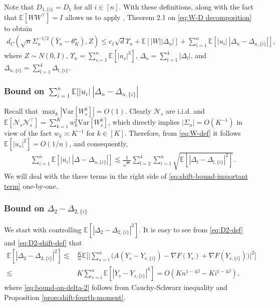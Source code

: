 \documentclass[a4paper,11pt]{article}
\numberwithin{equation}{section}
\theoremstyle{plain}
\theoremstyle{remark}
\def\IE{\mathbb{E}}
\newcommand{\shift}[2]{#1_{#2, \{i\}}}
\newcommand{\minparam}{\theta^\star_K}
\newcommand{\var}{\mathrm{Var}}
\begin{document}
Note that $\shift{D}{1}=D_1$ for all $i \in [n]$. With these definitions, along with the fact that $\IE[WW^\top]=I$ allows us to apply \cite{shao-berry-esseen}, Theorem 2.1 on \eqref{eq:W-D decomposition} to obtain
\begin{align} \label{eq:berry-esseen_initial}
    d_C( \sqrt{n}\Sigma_n^{-1/2}(\bar{Y}_n - \minparam) , Z) \leq c_1 \sqrt{d}\Upsilon_n + \IE[|W||\Delta_n|] + \sum_{i=1}^n \IE[|u_i| \  |\Delta_n- \shift{\Delta}{n}|],
\end{align}
where $Z \sim N(0, I)$, $\Upsilon_n =\sum_{s=1}^n \IE[|u_s|^3]$, $\Delta_n=\sum_{l=1}^4 |\Delta_l|$, and $\shift{\Delta}{n}=\sum_{l=1}^4 \shift{\Delta}{l}$.
\subsubsection{Bound on $\sum_{i=1}^n \IE[|u_i| \  |\Delta_n- \shift{\Delta}{n}|$}
Recall that $\max_k |\var[W_s^k]|=O(1)$. Clearly $\mathcal{N}_s$ are i.i.d. and $\IE[\mathcal{N}_s \mathcal{N}_s^\top]=\sum_{k=1}^K w_k^2 \var[W_s^k]$, which directly implies $|\Sigma_n| = O(K^{-1})$ in view of the fact $w_k \asymp K^{-1}$ for $k \in [K]$. Therefore, from \eqref{eq:W-def} it follows $\IE[|u_s|^2]=O(1/n)$, and consequently,
\begin{align}
    &\sum_{i=1}^n \IE[|u_i| \  |\Delta- \shift{\Delta}{n}|]
    \lesssim  \frac{1}{\sqrt{n}} \sum_{l=2}^4\sum_{i=1}^n\sqrt{\IE[|\Delta_l - \shift{\Delta}{l}|^2]}. \label{eq:shift-bound-important term}
\end{align}
We will deal with the three terms in the right side of \eqref{eq:shift-bound-important term} one-by-one.

\subsubsection{Bound on $\Delta_2 - \shift{\Delta}{2}$} \label{se:bound-start}
We start with controlling $\IE[|\Delta_2 - \shift{\Delta}{2}|^2]$. It is easy to see from \eqref{eq:D2-def} and \eqref{eq:D2-shift-def} that
\begin{align}
    \IE[|\Delta_2 - \shift{\Delta}{2}|^2] \lesssim & {\frac{K}{n}} \IE\bigg[\Big| \sum_{s=i}^n \big(A(Y_{s} - \shift{Y}{s}) - \nabla F(Y_{s}) + \nabla F(\shift{Y}{s})\big)  \Big| ^2\bigg] \nonumber\\
    \lesssim & K \sum_{s=i}^n \IE[|Y_s - \shift{Y}{s}|^4]= O(Kn^{1-4\beta} - Ki^{1-4\beta}),
    \label{eq:bound-on-delta-2}
\end{align}
where \eqref{eq:bound-on-delta-2} follows from Cauchy-Schwarz inequality and Proposition \ref{prop:shift-fourth-moment}. 
\end{document}
